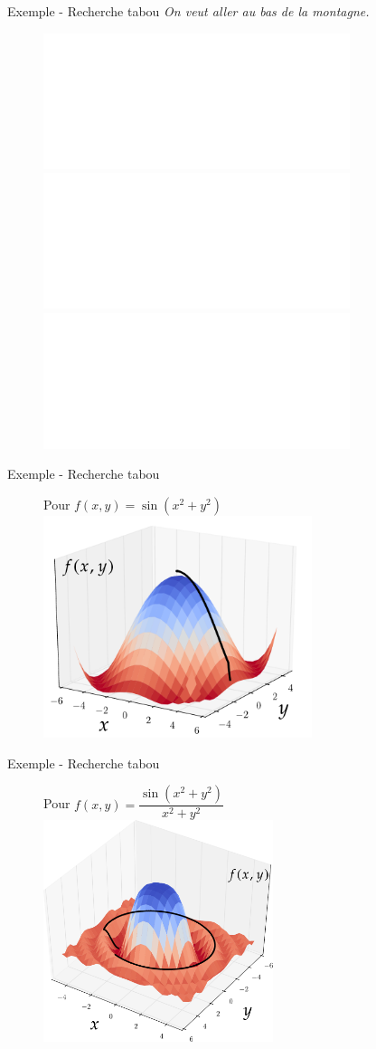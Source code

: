 \documentclass{beamer}
\begin{document}
\begin{frame}{Exemple - Recherche tabou}
  \textit{On veut aller au bas de la montagne.}
  \begin{figure}[tb]
    \centering
    \includegraphics<1>[width=0.8\textwidth]{figures/tabou1v2.pdf}
    \includegraphics<2>[width=0.8\textwidth]{figures/tabou2v2.pdf}
    \includegraphics<3>[width=0.8\textwidth]{figures/tabou3v2.pdf} 
  \end{figure}
\end{frame}


\begin{frame}{Exemple - Recherche tabou}


  \begin{figure}[tb]
    \centering
    Pour $f(x,y) = \sin(x^2+y^2)$
    \includegraphics[width=0.7\textwidth]{figures/3dtabufunc.pdf}
  \end{figure}
\end{frame}


\begin{frame}{Exemple - Recherche tabou}


  \begin{figure}[tb]
    \centering
    Pour $f(x,y) = \dfrac{\sin(x^2+y^2)}{x^2+y^2}$
    \includegraphics[width=0.6\textwidth]{figures/3dtabufunc2.pdf}
  \end{figure}
\end{frame}
\end{document}
